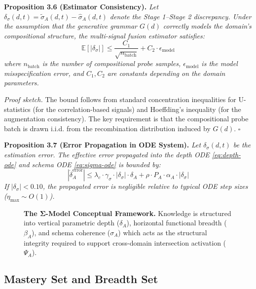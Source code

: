 \documentclass[11pt,a4paper]{article}
\begin{document}
\textbf{Proposition 3.6 (Estimator Consistency).}
\textit{Let $\delta_\sigma(d,t) = \tilde{\sigma}_A(d,t) - \hat{\sigma}_A(d,t)$
denote the Stage 1--Stage 2 discrepancy. Under the assumption that the
generative grammar $G(d)$ correctly models the domain's compositional
structure, the multi-signal fusion estimator satisfies:
\begin{equation}\label{eq:estimator-bound}
\mathbb{E}[|\delta_\sigma|] \leq \frac{C_1}{\sqrt{n_{\text{batch}}}} + C_2 \cdot \epsilon_{\text{model}}
\end{equation}
where $n_{\text{batch}}$ is the number of compositional probe samples,
$\epsilon_{\text{model}}$ is the model misspecification error, and $C_1, C_2$
are constants depending on the domain parameters.}

\textit{Proof sketch.} The bound follows from standard concentration
inequalities for U-statistics (for the correlation-based signals) and
Hoeffding's inequality (for the augmentation consistency). The key
requirement is that the compositional probe batch is drawn i.i.d. from
the recombination distribution induced by $G(d)$. $\square$

\textbf{Proposition 3.7 (Error Propagation in ODE System).}
\textit{Let $\delta_\sigma(d,t)$ be the estimation error. The effective
error propagated into the depth ODE \eqref{eq:depth-ode} and schema ODE
\eqref{eq:sigma-ode} is bounded by:
\begin{equation}\label{eq:error-propagation}
|\dot{\delta}_A^{\text{error}}| \leq \lambda_c \cdot \gamma_\sigma \cdot |\delta_\sigma| \cdot \delta_A + \rho \cdot P_A \cdot \alpha_A \cdot |\delta_\sigma|
\end{equation}
If $|\delta_\sigma| < 0.10$, the propagated error is negligible relative
to typical ODE step sizes ($\eta_{\max} \sim O(1)$).}

\begin{figure}[htbp]
\centering
\resizebox{0.85\textwidth}{!}{}
\caption{\textbf{The Σ-Model Conceptual Framework.} Knowledge is
structured into vertical parametric depth ($\delta_A$), horizontal
functional breadth ($\beta_A$), and schema coherence ($\sigma_A$) which
acts as the structural integrity required to support cross-domain
intersection activation ($\Psi_A$).}
\label{fig:sigma-framework}
\end{figure}

\subsection{Mastery Set and Breadth Set}\label{sec:mastery-set}
\end{document}
